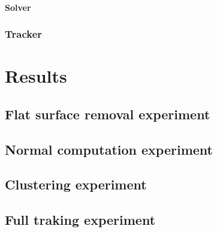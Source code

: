 \documentclass[LaM,binding=0.6cm]{sapthesis}
\begin{document}
  \subsubsection{Solver}
\subsection{Tracker}



\chapter{Results}

\section{Flat surface removal experiment}
\section{Normal computation experiment}
\section{Clustering experiment}
\section{Full traking experiment}





\backmatter
\end{document}
